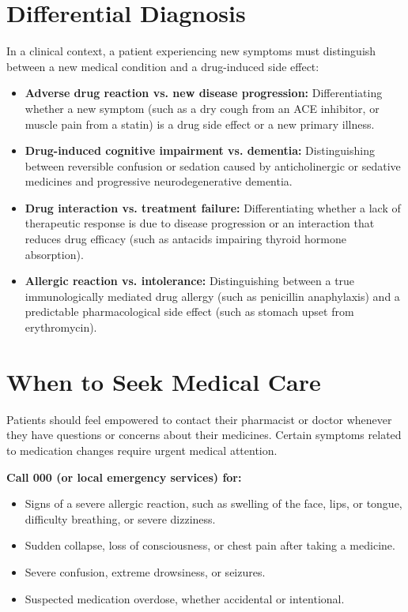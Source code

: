 \section*{Differential Diagnosis}
In a clinical context, a patient experiencing new symptoms must distinguish between a new medical condition and a drug-induced side effect:
\begin{itemize}
    \item \textbf{Adverse drug reaction vs. new disease progression:} Differentiating whether a new symptom (such as a dry cough from an ACE inhibitor, or muscle pain from a statin) is a drug side effect or a new primary illness.
    \item \textbf{Drug-induced cognitive impairment vs. dementia:} Distinguishing between reversible confusion or sedation caused by anticholinergic or sedative medicines and progressive neurodegenerative dementia.
    \item \textbf{Drug interaction vs. treatment failure:} Differentiating whether a lack of therapeutic response is due to disease progression or an interaction that reduces drug efficacy (such as antacids impairing thyroid hormone absorption).
    \item \textbf{Allergic reaction vs. intolerance:} Distinguishing between a true immunologically mediated drug allergy (such as penicillin anaphylaxis) and a predictable pharmacological side effect (such as stomach upset from erythromycin).
\end{itemize}

\section*{When to Seek Medical Care}
Patients should feel empowered to contact their pharmacist or doctor whenever they have questions or concerns about their medicines. Certain symptoms related to medication changes require urgent medical attention.

\textbf{Call 000 (or local emergency services) for:}
\begin{itemize}
    \item Signs of a severe allergic reaction, such as swelling of the face, lips, or tongue, difficulty breathing, or severe dizziness.
    \item Sudden collapse, loss of consciousness, or chest pain after taking a medicine.
    \item Severe confusion, extreme drowsiness, or seizures.
    \item Suspected medication overdose, whether accidental or intentional.
\end{itemize}

